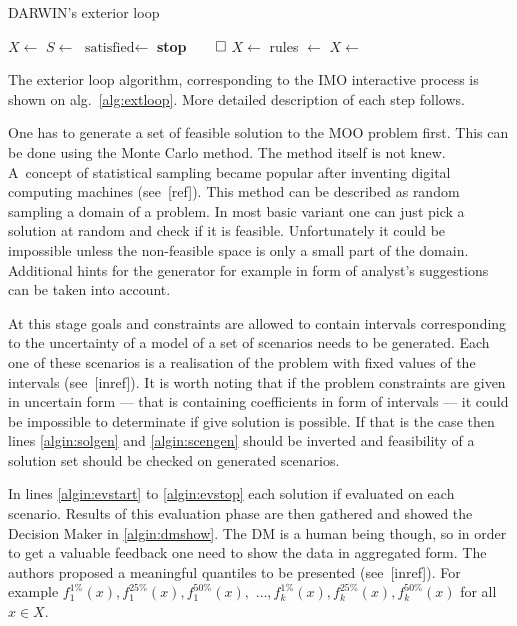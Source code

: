 \begin{algorithm}
\caption{DARWIN's exterior loop}\label{alg:extloop}
  \begin{algorithmic}[1]
    \State $X \gets$  \label{algin:solgen}
    \State $S \gets$  \label{algin:scengen}
    \Loop
     \label{algin:evstart}
    \State {} 
    \EndFor{} \label{algin:evstop}
    \State $\text{satisfied} \gets$  \label{algin:dmshow}
    \State \textbf{stop}$\qed$ 
    \Else
    \State $X \gets$  \label{algin:dmmark}
    \EndIf
    \State rules $\gets$  \label{algin:rules}
    \State $X \gets$   \label{algin:intloop}
    \EndLoop{}
  \end{algorithmic}
\end{algorithm}


The exterior loop algorithm, corresponding to the IMO interactive process is
shown on alg.~\ref{alg:extloop}. More detailed description of each step
follows.

One has to generate a set of feasible solution to the MOO problem first. This
can be done using the Monte Carlo method. The method itself is not
knew. A~concept of statistical sampling became popular after inventing digital
computing machines (see~[ref]). This method can be described as random
sampling a domain of a problem. In most basic variant one can just pick a
solution at random and check if it is feasible. Unfortunately it could be
impossible unless the non-feasible space is only a small part of the
domain. Additional hints for the generator for example in form of analyst's
suggestions can be taken into account.

At this stage goals and constraints are allowed to contain intervals
corresponding to the uncertainty of a model of a set of scenarios needs to be
generated. Each one of these scenarios is a realisation of the problem with
fixed values of the intervals (see~[inref]). It is worth noting that if the
problem constraints are given in uncertain form --- that is containing
coefficients in form of intervals --- it could be impossible to determinate if
give solution is possible. If that is the case then lines \ref{algin:solgen}
and \ref{algin:scengen} should be inverted and feasibility of a solution set
should be checked on generated scenarios.

In lines \ref{algin:evstart} to \ref{algin:evstop} each solution if evaluated
on each scenario. Results of this evaluation phase are then gathered and
showed the Decision Maker in \ref{algin:dmshow}. The DM is a human being
though, so in order to get a valuable feedback one need to show the data in
aggregated form. The authors proposed a meaningful quantiles to be presented
(see~[inref]). For example $f^{1\%}_1(x), f^{25\%}_1(x), f^{50\%}_1(x),$
$\dots, f^{1\%}_k(x), f^{25\%}_k(x), f^{50\%}_k(x)$ for all $x \in X$.

